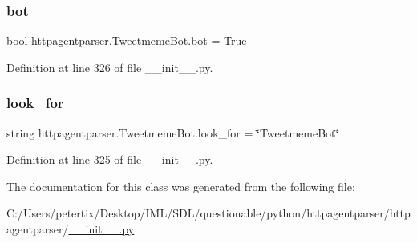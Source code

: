 \subsubsection{\texorpdfstring{bot}{bot}}
{\footnotesize\ttfamily bool httpagentparser.\+Tweetmeme\+Bot.\+bot = True\hspace{0.3cm}{\ttfamily [static]}}



Definition at line 326 of file \+\_\+\+\_\+init\+\_\+\+\_\+.\+py.

\hypertarget{classhttpagentparser_1_1_tweetmeme_bot_abdf14c9335f4685790d1ac31725f6485}{}\label{classhttpagentparser_1_1_tweetmeme_bot_abdf14c9335f4685790d1ac31725f6485} 
\subsubsection{\texorpdfstring{look\+\_\+for}{look\_for}}
{\footnotesize\ttfamily string httpagentparser.\+Tweetmeme\+Bot.\+look\+\_\+for = \char`\"{}Tweetmeme\+Bot\char`\"{}\hspace{0.3cm}{\ttfamily [static]}}



Definition at line 325 of file \+\_\+\+\_\+init\+\_\+\+\_\+.\+py.



The documentation for this class was generated from the following file\+:\begin{DoxyCompactItemize}
\item 
C\+:/\+Users/petertix/\+Desktop/\+I\+M\+L/\+S\+D\+L/questionable/python/httpagentparser/httpagentparser/\hyperlink{____init_____8py}{\+\_\+\+\_\+init\+\_\+\+\_\+.\+py}\end{DoxyCompactItemize}
